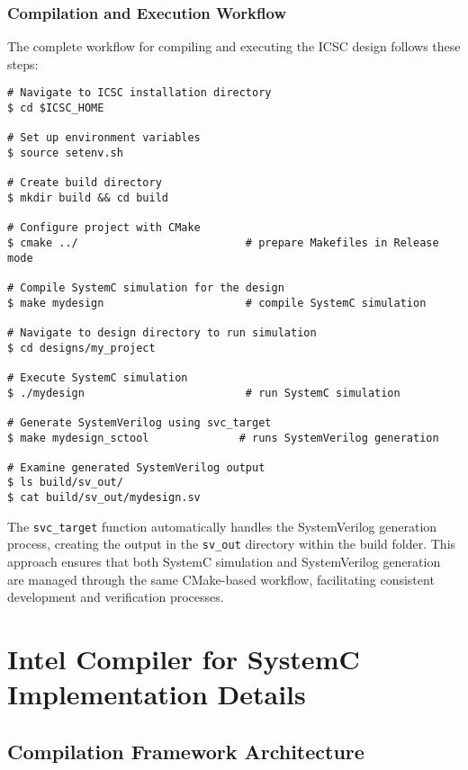 \subsubsection{Compilation and Execution Workflow}
\label{subsubsec:compilation_workflow}

The complete workflow for compiling and executing the ICSC design follows these steps:

\begin{lstlisting}[caption={ICSC Compilation and Execution},label=lst:icsc_workflow]
# Navigate to ICSC installation directory
$ cd $ICSC_HOME

# Set up environment variables
$ source setenv.sh

# Create build directory
$ mkdir build && cd build

# Configure project with CMake
$ cmake ../                          # prepare Makefiles in Release mode

# Compile SystemC simulation for the design
$ make mydesign                      # compile SystemC simulation

# Navigate to design directory to run simulation
$ cd designs/my_project

# Execute SystemC simulation
$ ./mydesign                         # run SystemC simulation

# Generate SystemVerilog using svc_target
$ make mydesign_sctool              # runs SystemVerilog generation

# Examine generated SystemVerilog output
$ ls build/sv_out/
$ cat build/sv_out/mydesign.sv
\end{lstlisting}

The \texttt{svc\_target} function automatically handles the SystemVerilog generation process, creating the output in the \texttt{sv\_out} directory within the build folder. This approach ensures that both SystemC simulation and SystemVerilog generation are managed through the same CMake-based workflow, facilitating consistent development and verification processes.

\section{Intel Compiler for SystemC Implementation Details}
\label{sec:icsc_implementation}

\subsection{Compilation Framework Architecture}
\label{subsec:compilation_framework}

